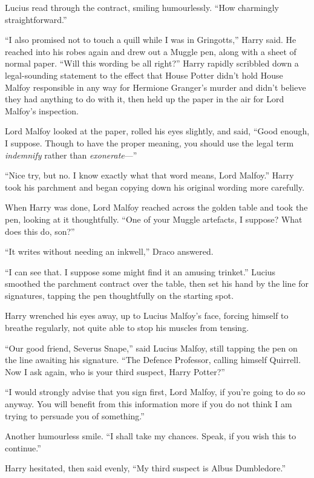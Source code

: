 Lucius read through the contract, smiling humourlessly. “How charmingly straightforward.”

“I also promised not to touch a quill while I was in Gringotts,” Harry said. He reached into his robes again and drew out a Muggle pen, along with a sheet of normal paper. “Will this wording be all right?” Harry rapidly scribbled down a legal-sounding statement to the effect that House Potter didn’t hold House Malfoy responsible in any way for Hermione Granger’s murder and didn’t believe they had anything to do with it, then held up the paper in the air for Lord Malfoy’s inspection.

Lord Malfoy looked at the paper, rolled his eyes slightly, and said, “Good enough, I suppose. Though to have the proper meaning, you should use the legal term \emph{indemnify} rather than \emph{exonerate}—”

“Nice try, but no. I know exactly what that word means, Lord Malfoy.” Harry took his parchment and began copying down his original wording more carefully.

When Harry was done, Lord Malfoy reached across the golden table and took the pen, looking at it thoughtfully. “One of your Muggle artefacts, I suppose? What does this do, son?”

“It writes without needing an inkwell,” Draco answered.

“I can see that. I suppose some might find it an amusing trinket.” Lucius smoothed the parchment contract over the table, then set his hand by the line for signatures, tapping the pen thoughtfully on the starting spot.

Harry wrenched his eyes away, up to Lucius Malfoy’s face, forcing himself to breathe regularly, not quite able to stop his muscles from tensing.

“Our good friend, Severus Snape,” said Lucius Malfoy, still tapping the pen on the line awaiting his signature. “The Defence Professor, calling himself Quirrell. Now I ask again, who is your third suspect, Harry Potter?”

“I would strongly advise that you sign first, Lord Malfoy, if you’re going to do so anyway. You will benefit from this information more if you do not think I am trying to persuade you of something.”

Another humourless smile. “I shall take my chances. Speak, if you wish this to continue.”

Harry hesitated, then said evenly, “My third suspect is Albus Dumbledore.”

